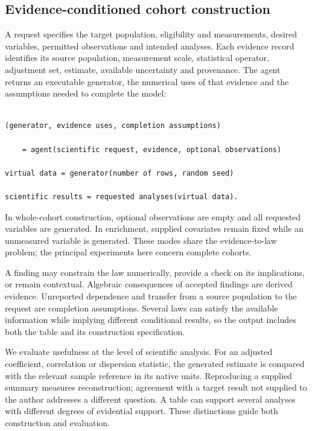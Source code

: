 \documentclass[10pt,twocolumn]{article}
\begin{document}
\subsection{Evidence-conditioned cohort construction}

A request specifies the target population, eligibility and measurements, desired variables, permitted observations and intended analyses. Each evidence record identifies its source population, measurement scale, statistical operator, adjustment set, estimate, available uncertainty and provenance. The agent returns an executable generator, the numerical uses of that evidence and the assumptions needed to complete the model:


\noindent\begin{minipage}{\columnwidth}

\begin{lstlisting}

(generator, evidence uses, completion assumptions)

    = agent(scientific request, evidence, optional observations)

virtual data = generator(number of rows, random seed)

scientific results = requested analyses(virtual data).

\end{lstlisting}

\end{minipage}

In whole-cohort construction, optional observations are empty and all requested variables are generated. In enrichment, supplied covariates remain fixed while an unmeasured variable is generated. These modes share the evidence-to-law problem; the principal experiments here concern complete cohorts.


A finding may constrain the law numerically, provide a check on its implications, or remain contextual. Algebraic consequences of accepted findings are derived evidence. Unreported dependence and transfer from a source population to the request are completion assumptions. Several laws can satisfy the available information while implying different conditional results, so the output includes both the table and its construction specification.


We evaluate usefulness at the level of scientific analysis. For an adjusted coefficient, correlation or dispersion statistic, the generated estimate is compared with the relevant sample reference in its native units. Reproducing a supplied summary measures reconstruction; agreement with a target result not supplied to the author addresses a different question. A table can support several analyses with different degrees of evidential support. These distinctions guide both construction and evaluation.
\end{document}
